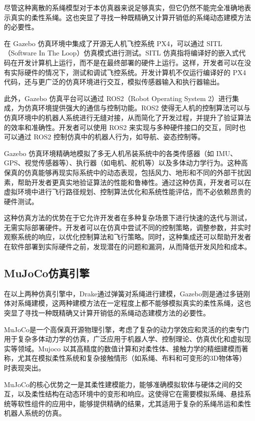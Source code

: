 \documentclass[lang=chs, degree=master, blindreview=true, winfonts=true]{yanputhesis}
\begin{document}
尽管这种离散的系绳模型对于本仿真器来说足够真实，但它仍然不能完全准确地表示真实的柔性系绳。这也突显了寻找一种既精确又计算开销低的系绳动态建模方法的必要性。

在 Gazebo 仿真环境中集成了开源无人机飞控系统 PX4，可以通过 SITL（Software In The Loop）仿真模式进行测试。SITL 仿真指将编译好的嵌入式代码在开发计算机上运行，而不是在最终部署的硬件上运行。这样，开发者可以在没有实际硬件的情况下，测试和调试飞控系统。开发计算机不仅运行编译好的 PX4 代码，还与更广泛的仿真环境进行交互，模拟传感器输入和执行器输出。

此外，Gazebo 仿真平台可以通过 ROS2（Robot Operating System 2）进行集成，为仿真环境提供强大的通信与控制功能。ROS2 使得无人机的控制算法可以与仿真环境中的机器人系统进行无缝对接，从而简化了开发过程，并提升了验证算法的效率和准确性。开发者可以使用 ROS2 来实现与多种硬件接口的交互，同时也可以通过 ROS2 控制仿真中的机器人行为，如导航、姿态控制等。

Gazebo 仿真环境精确地模拟了多无人机吊装系统中的各类传感器（如 IMU、GPS、视觉传感器等）、执行器（如电机、舵机等）以及多体动力学行为。这种高保真的仿真能够再现实际系统中的动态表现，包括风力、地形和不同的外部干扰因素，帮助开发者更真实地验证算法的性能和鲁棒性。通过这种仿真，开发者可以在虚拟环境中进行飞行路径规划、控制算法优化和系统性能评估，而不必依赖昂贵的硬件测试。

这种仿真方法的优势在于它允许开发者在多种复杂场景下进行快速的迭代与测试，无需实际部署硬件。开发者可以在仿真中尝试不同的控制策略，调整参数，并实时观察系统的响应，以优化控制算法和飞行策略。同时，这种集成还可以帮助开发者在软件部署到实际硬件之前，发现潜在的问题和漏洞，从而降低开发风险和成本。

\subsection{MuJoCo仿真引擎}

在以上两种仿真引擎中，Drake通过弹簧对系绳进行建模，Gazebo则是通过多链刚体对系绳建模，这两种建模方法在一定程度上都不能够模拟真实的柔性系绳，这也突显了寻找一种既精确又计算开销低的系绳动态建模方法的必要性。

MuJoCo是一个高保真开源物理引擎，考虑了复杂的动力学效应和灵活的约束专门用于复杂多体动力学的仿真，广泛应用于机器人学、控制理论、仿真优化和虚拟现实等领域。Mujoco 以其高精度的数值计算和对柔性体、接触力学的精细建模而著称，尤其在模拟柔性系统和复杂接触情形（如系绳、布料和可变形的3D物体等）时表现突出。

MuJoCo的核心优势之一是其柔性建模能力，能够准确模拟软体与硬体之间的交互，以及柔性结构在动态环境中的变形和响应。这使得它在需要模拟系绳、悬挂系统等软性组件的应用中，能够提供精确的结果，尤其适用于复杂的系绳吊运和柔性机器人系统的仿真。
\end{document}
